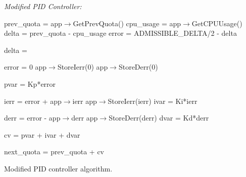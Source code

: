 \begin{algorithm}
    \DontPrintSemicolon
    \BlankLine
    \algrule
 \nonl\emph{Modified PID Controller:}\;
\BlankLine
  {
    prev\_quota = app$\rightarrow$GetPrevQuota()\;
    cpu\_usage = app$\rightarrow$GetCPUUsage()\;
    delta = prev\_quota - cpu\_usage\;
    error = ADMISSIBLE\_DELTA/2 - delta\;
    
   
    {
        delta = 
    }
    
        {error = 0
        app$\rightarrow$StoreIerr(0)\;
        app$\rightarrow$StoreDerr(0)\;}
    
    pvar = Kp*error

    
    ierr = error + app$\rightarrow$ierr\;
    app$\rightarrow$StoreIerr(ierr)\;
    ivar = Ki*ierr
    
   
    derr = error - app$\rightarrow$derr\; 
     app$\rightarrow$StoreDerr(derr)\;
    dvar = Kd*derr 

    cv = pvar + ivar + dvar
    
     next\_quota = prev\_quota + cv
  \BlankLine
        
    }
        \BlankLine
    \BlankLine
   \caption{Modified PID controller algorithm.}
   \label{alg:pid}
\end{algorithm}